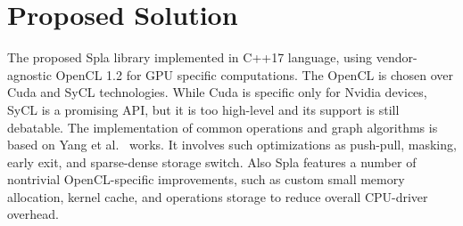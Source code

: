 \section{Proposed Solution}

The proposed Spla library implemented in C++17 language, using vendor-agnostic OpenCL 1.2 for GPU specific computations. The OpenCL is chosen over Cuda and SyCL technologies. While Cuda is specific only for Nvidia devices, SyCL is a promising API, but it is too high-level and its support is still debatable. The implementation of common operations and graph algorithms is based on Yang et al.~\cite{7284398:spvspm, https://doi.org/10.48550/arxiv.1804.03327:pushpull, yang2019graphblast} works. It involves such optimizations as push-pull, masking, early exit, and sparse-dense storage switch. Also Spla features a number of nontrivial OpenCL-specific improvements, such as custom small memory allocation, kernel cache, and operations storage to reduce overall CPU-driver overhead.